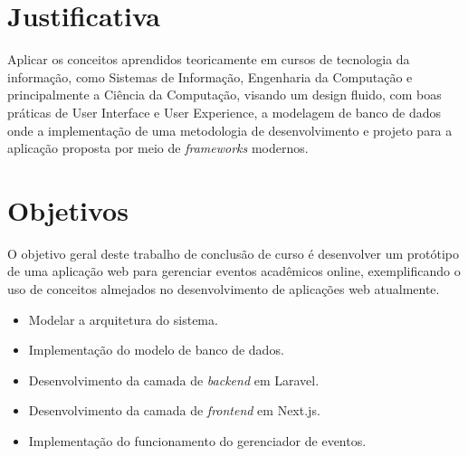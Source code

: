 

\section{Justificativa}

Aplicar os conceitos aprendidos teoricamente em cursos de tecnologia da informação, como Sistemas de Informação, Engenharia da Computação e principalmente a Ciência da Computação, visando um design fluido, com boas práticas de User Interface e User Experience, a modelagem de banco de dados onde a implementação de uma metodologia de desenvolvimento e projeto para a aplicação proposta por meio de \textit{frameworks} modernos.


\section{Objetivos}
O objetivo geral deste trabalho de conclusão de curso é desenvolver um protótipo de uma aplicação web para gerenciar eventos acadêmicos online, exemplificando o uso de conceitos almejados no desenvolvimento de aplicações web atualmente. 

\begin{itemize}
    \item Modelar a arquitetura do sistema.
    \item Implementação do modelo de banco de dados.
    \item Desenvolvimento da camada de \textit{backend} em Laravel.
    \item Desenvolvimento da camada de \textit{frontend} em Next.js.
    \item Implementação do funcionamento do gerenciador de eventos.
\end{itemize}

